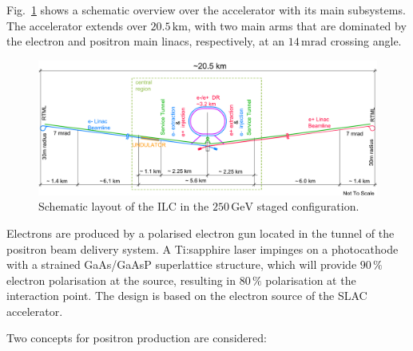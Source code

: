 \documentclass[%
 reprint,
 amsmath,amssymb,
 aps,
]{revtex4-1}
\def\Fig#1{Fig.~\ref{#1}}
\begin{document}
\Fig{fig_ilc-schematic} shows a schematic overview over the accelerator with its main subsystems.
The accelerator extends over $20.5\,{\mathrm{km}}$, with two main arms that are dominated by the electron and positron main linacs, respectively, at an $14\,{\mathrm{mrad}}$ crossing angle.

 \begin{figure}[tb]
 \begin{center}
 \includegraphics[width=\hsize]{figures/TDR-machine-layout-cartoon-staged.pdf}
\caption{Schematic layout of the ILC in the $250\,{\mathrm{GeV}}$ staged configuration.
\label{fig_ilc-schematic}}
 \end{center}
 \end{figure}

Electrons are produced by a polarised electron gun located in the tunnel of the positron beam delivery system. A Ti:sapphire laser impinges on a photocathode with a strained GaAs/GaAsP superlattice structure, which will provide  $90\,\%$ electron polarisation at the source, resulting in $80\,\%$ polarisation at the interaction point. The design is based on the electron source of the SLAC accelerator. 

Two concepts for positron production are considered:
\end{document}
